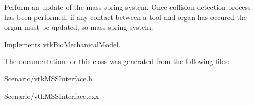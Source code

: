 Perform an update of the mass-\/spring system. Once collision detection process has been performed, if any contact between a tool and organ has occured the organ must be updated, so mass-\/spring system. 

Implements \hyperlink{classvtkBioMechanicalModel_a147f53dac1854b61f88330c59817b822}{vtkBioMechanicalModel}.

The documentation for this class was generated from the following files:\begin{DoxyCompactItemize}
\item 
Scenario/vtkMSSInterface.h\item 
Scenario/vtkMSSInterface.cxx\end{DoxyCompactItemize}
